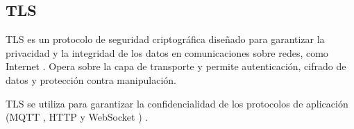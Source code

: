 

\subsection{TLS}

TLS es un protocolo de seguridad criptográfica diseñado para garantizar la
privacidad y la integridad de los datos en comunicaciones sobre redes, como
Internet \cite{tls}. Opera sobre la capa de transporte y permite autenticación,
cifrado de datos y protección contra manipulación.

TLS se utiliza para garantizar la confidencialidad de los protocolos de
aplicación (MQTT \cite{OASIS_MQTT_Standard}, HTTP \cite{IBMTCPIP} y WebSocket
\cite{RFC6455}) \cite{awsiot_tls}.






